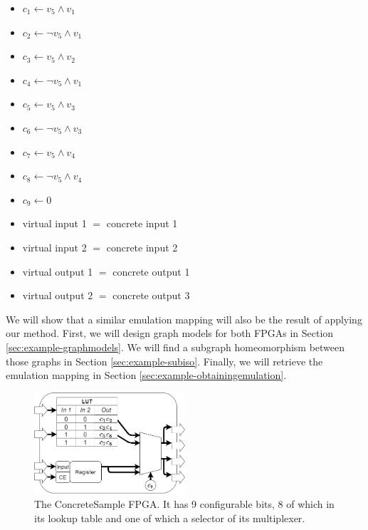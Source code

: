\begin{minipage}{\textwidth}
\begin{itemize}
\item $c_1 \longleftarrow v_5 \land v_1$
\item $c_2 \longleftarrow \lnot v_5 \land v_1$
\item $c_3 \longleftarrow v_5 \land v_2$
\item $c_4 \longleftarrow \lnot v_5 \land v_1$
\item $c_5 \longleftarrow v_5 \land v_3$
\item $c_6 \longleftarrow \lnot v_5 \land v_3$
\item $c_7 \longleftarrow v_5 \land v_4$
\item $c_8 \longleftarrow \lnot v_5 \land v_4$
\item $c_9 \longleftarrow 0$
\item virtual input 1 $=$ concrete input 1
\item virtual input 2 $=$ concrete input 2
\item virtual output 1 $=$ concrete output 1
\item virtual output 2 $=$ concrete output 3
\end{itemize}
\end{minipage}

We will show that a similar emulation mapping will also be the result of applying our method. First, we will design graph models for both FPGAs in Section \ref{sec:example-graphmodels}. We will find a subgraph homeomorphism between those graphs in Section \ref{sec:example-subiso}. Finally, we will retrieve the emulation mapping in Section \ref{sec:example-obtainingemulation}.

	

\begin{figure}[t]
\centering
\includegraphics[width=0.5\textwidth]{images/endToEnd/exampleFPGAConcrete.png}
\caption{The ConcreteSample FPGA. It has 9 configurable bits, 8 of which in its lookup table and one of which a selector of its multiplexer.}
\label{fig:conboardconfigs}
\end{figure}



